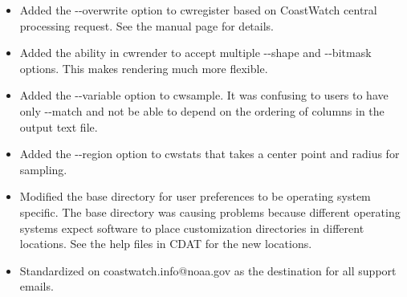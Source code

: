 \begin{itemize}
  \item Added the {-}-overwrite option to cwregister based on
  CoastWatch central processing request.  See the manual page for
  details.

  \item Added the ability in cwrender to accept multiple
  {-}-shape and {-}-bitmask options.  This makes rendering much
  more flexible.

  \item Added the {-}-variable option to cwsample.  It was
  confusing to users to have only {-}-match and not be able to
  depend on the ordering of columns in the output text file.

  \item Added the {-}-region option to cwstats that takes a
  center point and radius for sampling.

  \item Modified the base directory for user preferences to be
  operating system specific.  The base directory was causing
  problems because different operating systems expect software to
  place customization directories in different locations.  See
  the help files in CDAT for the new locations.

  \item Standardized on coastwatch.info@noaa.gov as the
  destination for all support emails.

\end{itemize}


